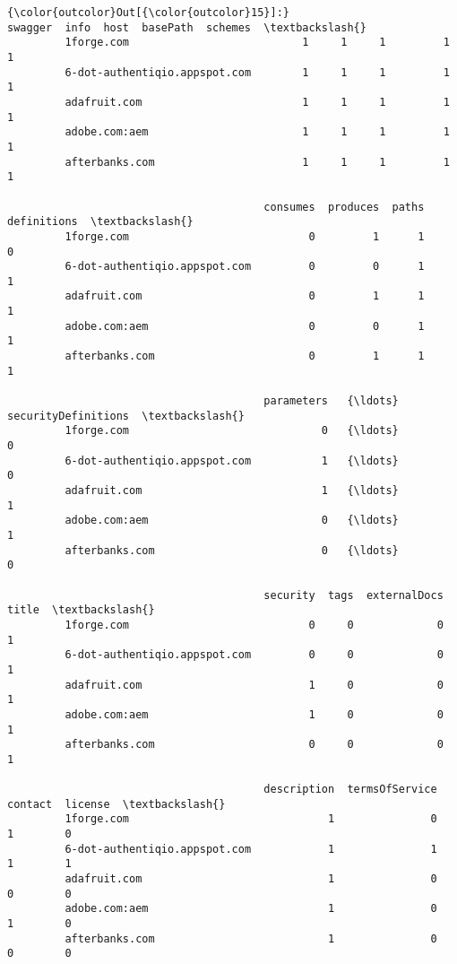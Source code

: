 \documentclass[11pt]{article}
\begin{document}
\begin{Verbatim}[commandchars=\\\{\}]
{\color{outcolor}Out[{\color{outcolor}15}]:}                                swagger  info  host  basePath  schemes  \textbackslash{}
         1forge.com                           1     1     1         1        1   
         6-dot-authentiqio.appspot.com        1     1     1         1        1   
         adafruit.com                         1     1     1         1        1   
         adobe.com:aem                        1     1     1         1        1   
         afterbanks.com                       1     1     1         1        1   
         
                                        consumes  produces  paths  definitions  \textbackslash{}
         1forge.com                            0         1      1            0   
         6-dot-authentiqio.appspot.com         0         0      1            1   
         adafruit.com                          0         1      1            1   
         adobe.com:aem                         0         0      1            1   
         afterbanks.com                        0         1      1            1   
         
                                        parameters   {\ldots}     securityDefinitions  \textbackslash{}
         1forge.com                              0   {\ldots}                       0   
         6-dot-authentiqio.appspot.com           1   {\ldots}                       0   
         adafruit.com                            1   {\ldots}                       1   
         adobe.com:aem                           0   {\ldots}                       1   
         afterbanks.com                          0   {\ldots}                       0   
         
                                        security  tags  externalDocs  title  \textbackslash{}
         1forge.com                            0     0             0      1   
         6-dot-authentiqio.appspot.com         0     0             0      1   
         adafruit.com                          1     0             0      1   
         adobe.com:aem                         1     0             0      1   
         afterbanks.com                        0     0             0      1   
         
                                        description  termsOfService  contact  license  \textbackslash{}
         1forge.com                               1               0        1        0   
         6-dot-authentiqio.appspot.com            1               1        1        1   
         adafruit.com                             1               0        0        0   
         adobe.com:aem                            1               0        1        0   
         afterbanks.com                           1               0        0        0   
         

\end{Verbatim}
\end{document}
